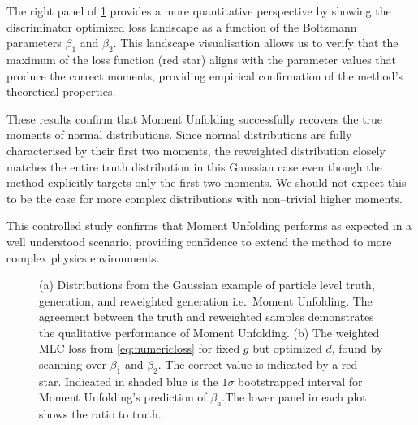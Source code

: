             The right panel of \cref{fig:gauss} provides a more quantitative perspective by showing the discriminator optimized loss landscape as a function of the Boltzmann parameters $\beta_1$ and $\beta_2$.
            This landscape visualisation allows us to verify that the maximum of the loss function (red star) aligns with the parameter values that produce the correct moments, providing empirical confirmation of the method's theoretical properties.

            These results confirm that Moment Unfolding successfully recovers the true moments of normal distributions.
            Since normal distributions are fully characterised by their first two moments, the reweighted distribution closely matches the entire truth distribution in this Gaussian case even though the method explicitly targets only the first two moments.
            We should not expect this to be the case for more complex distributions with non--trivial higher moments.

        This controlled study confirms that Moment Unfolding performs as expected in a well understood scenario, providing confidence to extend the method to more complex physics environments.
\begin{figure}
    \centering
    \caption{
    (a) Distributions from the Gaussian example of particle level truth, generation, and reweighted generation i.e.~Moment Unfolding.
    The agreement between the truth and reweighted samples demonstrates the qualitative performance of Moment Unfolding.
    (b) The weighted MLC loss from \cref{eq:numericloss} for fixed $g$ but optimized $d$, found by scanning over $\beta_1$ and $\beta_2$.
    The correct value is indicated by a red star.
    Indicated in shaded blue is the $1\sigma$ bootstrapped interval for Moment Unfolding's prediction of $\beta_a$.The lower panel in each plot shows the ratio to truth.
    }
        \label{fig:gauss}
\end{figure}
